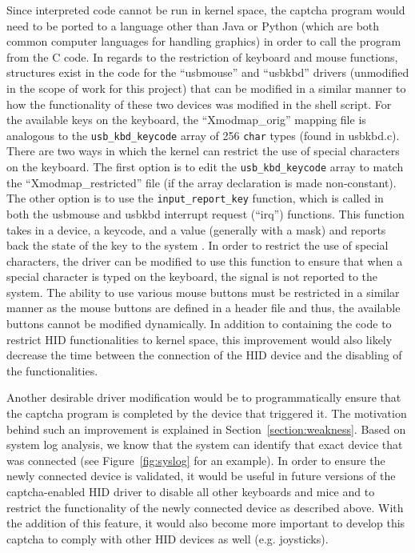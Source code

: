 \documentclass[pagenumbers]{ieee}
\begin{document}
Since interpreted code cannot be run in kernel space, the captcha program would need to be ported to a language other than Java or Python (which are both common computer languages for handling graphics) in order to call the program from the C code. In regards to the restriction of keyboard and mouse functions, structures exist in the code for the ``usbmouse'' and ``usbkbd'' drivers (unmodified in the scope of work for this project) that can be modified in a similar manner to how the functionality of these two devices was modified in the shell script. For the available keys on the keyboard, the ``Xmodmap\_orig'' mapping file is  analogous to the \texttt{usb\_kbd\_keycode} array of 256 \texttt{char} types (found in usbkbd.c). There are two ways in which the kernel can restrict the use of special characters on the keyboard. The first option is to edit the \texttt{usb\_kbd\_keycode} array to match the ``Xmodmap\_restricted'' file (if the array declaration is made non-constant). The other option is to use the \texttt{input\_report\_key} function, which is called in both the usbmouse and usbkbd interrupt request (``irq'') functions. This function takes in a device, a keycode, and a value (generally with a mask) and reports back the state of the key to the system \cite{input}. In order to restrict the use of special characters, the driver can be modified to use this function to ensure that when a special character is typed on the keyboard, the signal is not reported to the system. The ability to use various mouse buttons must be restricted in a similar manner as the mouse buttons are defined in a header file and thus, the available buttons cannot be modified dynamically. In addition to containing the code to restrict HID functionalities to kernel space, this improvement would also likely decrease the time between the connection of the HID device and the disabling of the functionalities.

Another desirable driver modification would be to programmatically ensure that the captcha program is completed by the device that triggered it. The motivation behind such an improvement is explained in Section~\ref{section:weakness}. Based on system log analysis, we know that the system can identify that exact device that was connected (see Figure~\ref{fig:syslog} for an example). In order to ensure the newly connected device is validated, it would be useful in future versions of the captcha-enabled HID driver to disable all other keyboards and mice and to restrict the functionality of the newly connected device as described above. With the addition of this feature, it would also become more important to develop this captcha to comply with other HID devices as well (e.g. joysticks).
\end{document}
